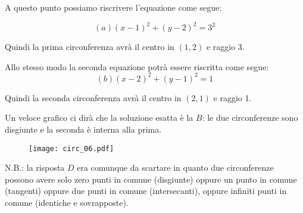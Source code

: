 A questo punto possiamo riscrivere l'equazione come segue:

\[
(a) (x-1)^2+(y-2)^2=3^2
\]

Quindi la prima circonferenza avrà il centro in $(1, 2)$ e raggio 3.

Allo stesso modo la seconda equazione potrà essere riscritta come segue:
\[
(b) (x-2)^2+(y-1)^2=1
\]

Quindi la seconda circonferenza avrà il centro in $(2, 1)$ e raggio 1.

Un veloce grafico ci dirà che la soluzione esatta è la $B$:
le due circonferenze sono disgiunte e la seconda è interna alla prima.

\begin{figure}[H]
\centering
\texttt{[image: circ\_06.pdf]}
\end{figure}

N.B.: la risposta $D$ era comunque da scartare in quanto due circonferenze
possono avere solo zero punti in comune (disgiunte) oppure un
punto in comune (tangenti) oppure due punti in comune (intersecanti),
oppure infiniti punti in comune (identiche e sovrapposte).



%
%
%
%
%
%
%
%
%
%
%
%
%


